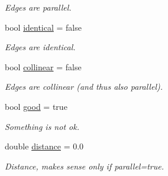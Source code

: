 \begin{DoxyCompactItemize}
\begin{DoxyCompactList}\small\item\em Edges are parallel. \item\end{DoxyCompactList}\item 
\hypertarget{structGeometry_1_1Intersection_a3a5657af0debf92f5653e1f7627ce417}{
bool \hyperlink{structGeometry_1_1Intersection_a3a5657af0debf92f5653e1f7627ce417}{identical} = false}
\label{structGeometry_1_1Intersection_a3a5657af0debf92f5653e1f7627ce417}

\begin{DoxyCompactList}\small\item\em Edges are identical. \item\end{DoxyCompactList}\item 
\hypertarget{structGeometry_1_1Intersection_a468bd7fe9703f6bd57aabbd0d957668e}{
bool \hyperlink{structGeometry_1_1Intersection_a468bd7fe9703f6bd57aabbd0d957668e}{collinear} = false}
\label{structGeometry_1_1Intersection_a468bd7fe9703f6bd57aabbd0d957668e}

\begin{DoxyCompactList}\small\item\em Edges are collinear (and thus also parallel). \item\end{DoxyCompactList}\item 
\hypertarget{structGeometry_1_1Intersection_adde469457ed9ef6a0a9df12d5c5be23f}{
bool \hyperlink{structGeometry_1_1Intersection_adde469457ed9ef6a0a9df12d5c5be23f}{good} = true}
\label{structGeometry_1_1Intersection_adde469457ed9ef6a0a9df12d5c5be23f}

\begin{DoxyCompactList}\small\item\em Something is not ok. \item\end{DoxyCompactList}\item 
\hypertarget{structGeometry_1_1Intersection_a08f4c2d8a818d21883e35c932088b6ed}{
double \hyperlink{structGeometry_1_1Intersection_a08f4c2d8a818d21883e35c932088b6ed}{distance} = 0.0}
\label{structGeometry_1_1Intersection_a08f4c2d8a818d21883e35c932088b6ed}

\begin{DoxyCompactList}\small\item\em Distance, makes sense only if parallel=true. \item\end{DoxyCompactList}\end{DoxyCompactItemize}



